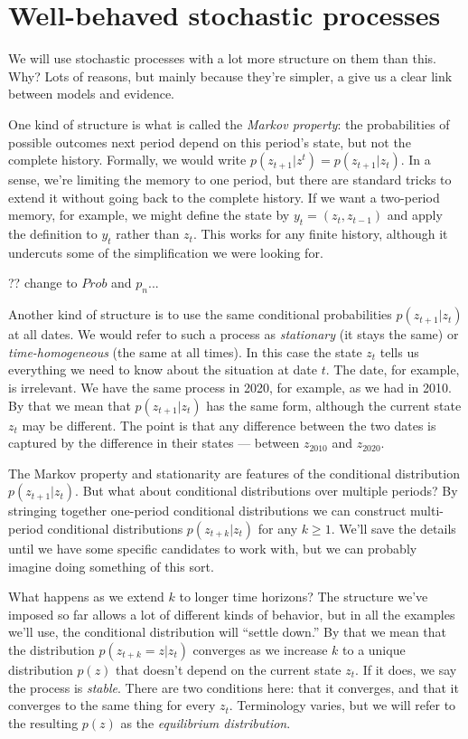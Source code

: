 \documentclass[11pt]{article}
\begin{document}
\section{Well-behaved stochastic processes}


We will use stochastic processes with a lot more structure
on them than this.
Why?  Lots of reasons, but mainly because they're simpler,
a give us a clear link between models and evidence.

One kind of structure is what is called the {\it Markov property\/}:
the probabilities of possible outcomes next period
depend on this period's state, but not the complete history.
Formally, we would write
$p(z_{t+1} | z^t ) = p(z_{t+1} | z_t ) $.
In a sense, we're limiting the memory to one period,
but there are standard tricks to extend it without going back to the complete history.
If we want a two-period memory, for example, we might define the state by
$y_t = (z_t, z_{t-1})$ and apply the definition to
$y_t$ rather than $z_t$.
This works for any finite history, although it undercuts some
of the simplification we were looking for.

?? change to $Prob$ and $p_n$...

Another kind of structure is to use the same conditional
probabilities $p(z_{t+1} | z_t)$ at all dates.
We would refer to such a process as {\it stationary\/}
(it stays the same) or
{\it time-homogeneous\/} (the same at all times).
In this case the state $z_t$ tells us everything we need to know
about the situation at date $t$.
The date, for example, is irrelevant.
We have the same process in 2020, for example, as we had in 2010.
By that we mean that $p(z_{t+1}|z_t)$ has the same form,
although the current state $z_t$ may be different.
The point is that any difference between the two dates is captured
by the difference in their states --- between $z_{2010}$ and $z_{2020}$.

The Markov property and stationarity
are features of the conditional distribution $p(z_{t+1} | z_t) $.
But what about conditional distributions over multiple periods?
By stringing together one-period conditional distributions
we can construct multi-period conditional distributions
$p(z_{t+k} | z_t) $ for any $k \geq 1$.
We'll save the details until we have some specific candidates to work
with, but we can probably imagine doing something of this sort.

What happens as we extend $k$ to longer time horizons?
The structure we've imposed so far allows a lot of different kinds
of behavior, but in all the examples we'll use,
the conditional distribution will ``settle down.''
By that we mean that the distribution $ p(z_{t+k} = z | z_t)$
converges as we increase $k$ to a unique distribution $p(z)$
that doesn't depend on the current state $z_t$.
If it does, we say the process is {\it stable\/}.
There are two conditions here:  that it converges, and that it converges
to the same thing for every $z_t$.
Terminology varies, but we will refer to the resulting $p(z)$ as the
{\it equilibrium distribution\/}.
\end{document}
